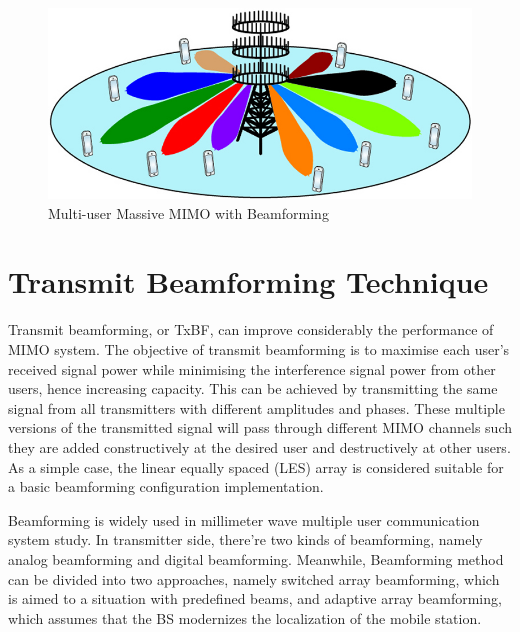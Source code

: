 \documentclass{article}
\begin{document}
\begin{figure}[b!]
\centering
\includegraphics[scale=0.35]{massive-mimo.jpg}
\caption{Multi-user Massive MIMO with Beamforming}
\label{fig:massivemimo}
\end{figure}


\section{Transmit Beamforming Technique}
Transmit beamforming, or TxBF, can improve considerably the performance of MIMO system. The objective of transmit beamforming is to maximise each user's received signal power while minimising the interference signal power from other users, hence increasing capacity. This can be achieved by transmitting the same signal from all transmitters with different amplitudes and phases. These multiple versions of the transmitted signal will pass through different MIMO channels such they are added constructively at the desired user and destructively at other users.\cite{BeamformingFuture}
As a simple case, the linear equally spaced (LES) array is considered suitable for a basic beamforming configuration implementation.

Beamforming is widely used in millimeter wave multiple user communication system study. In transmitter side, there're two kinds of beamforming, namely analog beamforming and digital beamforming. Meanwhile, Beamforming method can be divided into two approaches, namely switched array beamforming, which is aimed to a situation with predefined beams, and adaptive array beamforming, which assumes that the BS modernizes the localization of the mobile station.
\end{document}
